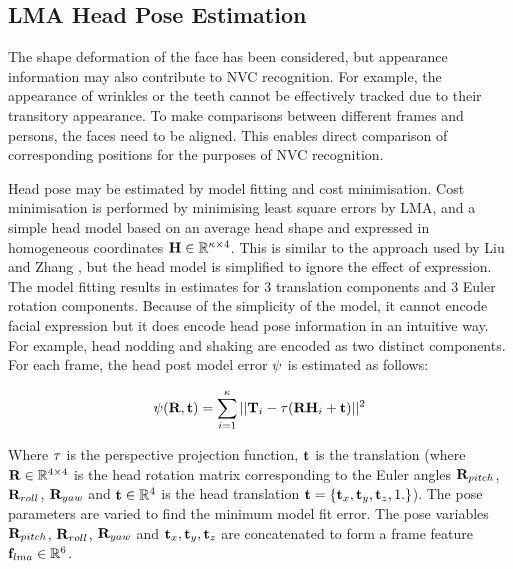 
\subsection{\ac{LMA} Head Pose Estimation}

The shape deformation of the face has been considered, but appearance information may also contribute to \ac{NVC} recognition. For example, the appearance of wrinkles or the teeth cannot be effectively tracked due to their transitory appearance. To make comparisons between different frames and persons, the faces need to be aligned. This enables direct comparison of corresponding positions for the purposes of \ac{NVC} recognition. 

Head pose may be estimated by model fitting and cost minimisation. Cost minimisation is performed by minimising least square errors by \acf{LMA}, and a simple head model based on an average head shape and expressed in homogeneous coordinates ${\textbf{H}} \in \mathbb{R}^{\kappa \times 4}$. This is similar to the approach used by Liu and Zhang \cite{Liu2000}, but the head model is simplified to ignore the effect of expression. The model fitting results in estimates for 3 translation components and 3 Euler rotation components. 
Because of the simplicity of the model, it cannot encode facial expression but it does encode head pose information in an intuitive way. For example, head nodding and shaking are encoded as two distinct components. For each frame, the head post model error $\psi$ is estimated as follows:

\begin{gather}
\psi(\textbf{R},\textbf{t}) = \displaystyle\sum_{i=1}^{\kappa} { ||{\textbf{T}}_{i} - \tau(\textbf{R} \textbf{H}_i + \textbf{t})||^2 }
\label {LmPoseEquation}
\end{gather}

Where $\tau$ is the perspective projection function, $\textbf{t}$ is the translation (where $\textbf{R} \in \mathbb{R}^{4 \times 4}$ is the head rotation matrix corresponding to the Euler angles {$\textbf{R}_{pitch}$, $\textbf{R}_{roll}$, $\textbf{R}_{yaw}$} and $\textbf{t} \in \mathbb{R}^{4}$ is the head translation $\textbf{t}=\{\textbf{t}_x, \textbf{t}_y, \textbf{t}_z, 1.\}$). The pose parameters are varied to find the minimum model fit error. The pose variables $\textbf{R}_{pitch}$, $\textbf{R}_{roll}$, $\textbf{R}_{yaw}$ and $\textbf{t}_x, \textbf{t}_y, \textbf{t}_z$ are concatenated to form a frame feature $\textbf{f}_{lma} \in \mathbb{R}^{6}$.

